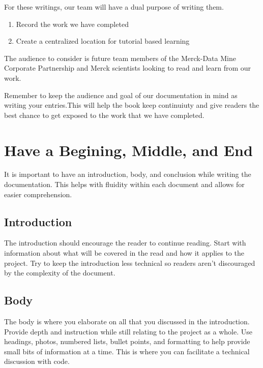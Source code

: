 \documentclass[]{book}
\begin{document}
For these writings, our team will have a dual purpose of writing them.

\begin{enumerate}
\def\labelenumi{\arabic{enumi}.}
\item
  Record the work we have completed
\item
  Create a centralized location for tutorial based learning
\end{enumerate}

The audience to consider is future team members of the Merck-Data Mine
Corporate Partnership and Merck scientists looking to read and learn
from our work.

Remember to keep the audience and goal of our documentation in mind as
writing your entries.This will help the book keep continuiuty and give
readers the best chance to get exposed to the work that we have
completed.

\section{Have a Begining, Middle, and
End}\label{have-a-begining-middle-and-end}

It is important to have an introduction, body, and conclusion while
writing the documentation. This helps with fluidity within each document
and allows for easier comprehension.

\subsection{Introduction}\label{introduction}

The introduction should encourage the reader to continue reading. Start
with information about what will be covered in the read and how it
applies to the project. Try to keep the introduction less technical so
readers aren't discouraged by the complexity of the document.

\subsection{Body}\label{body}

The body is where you elaborate on all that you discussed in the
introduction. Provide depth and instruction while still relating to the
project as a whole. Use headings, photos, numbered lists, bullet points,
and formatting to help provide small bits of information at a time. This
is where you can facilitate a technical discussion with code.
\end{document}
